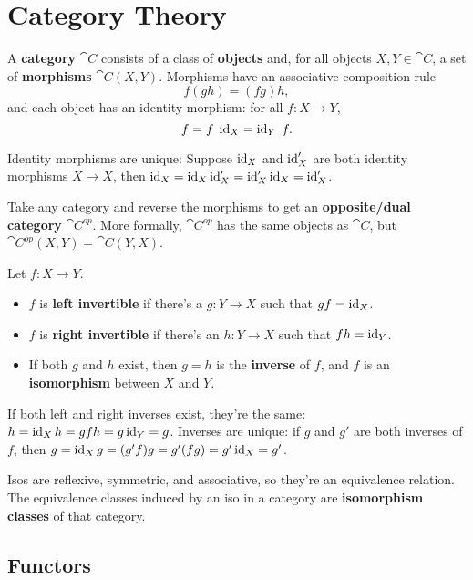 \documentclass[twoside,10pt]{report}
\begin{document}
\section{Category Theory}

\begin{defn}[]
A \textbf{category} $\cat{C}$ consists of a class of \textbf{objects} and, for all objects $X, Y \in \cat{C}$, a set of \textbf{morphisms} $\cat{C}(X,Y)$. Morphisms have an associative composition rule
\[
f(gh) = (fg)h,
\] 
and each object has an identity morphism: for all $f: X\to Y$,
\[
f = f\;\operatorname{id}_{X} = \operatorname{id}_{Y}\;f.
\] 
\end{defn}

\noindent Identity morphisms are unique: Suppose $\operatorname{id}_{X}$ and $\operatorname{id}_{X}'$ are both identity morphisms $X \to X$, then $\operatorname{id}_{X} = \operatorname{id}_{X}\operatorname{id}_{X}' = \operatorname{id}_{X}'\operatorname{id}_{X} = \operatorname{id}_{X}'$.

Take any category and reverse the morphisms to get an \textbf{opposite/dual category} $\cat{C}^{op}$. More formally, $\cat{C}^{op}$ has the same objects as $\cat{C}$, but $\cat{C}^{op}(X,Y) = \cat{C}(Y,X)$.

\begin{defn}[]
Let $f: X\to Y$.
\begin{itemize}
	\item $f$ is \textbf{left invertible} if there's a $g: Y \to X$ such that $gf = \operatorname{id}_{X}$.
	\item $f$ is \textbf{right invertible} if there's an $h: Y \to X$ such that $fh = \operatorname{id}_{Y}$.
	\item If both $g$ and $h$ exist, then $g=h$ is the \textbf{inverse} of $f$, and $f$ is an \textbf{isomorphism} between $X$ and $Y$.
\end{itemize}
\end{defn}

\noindent If both left and right inverses exist, they're the same: $h = \operatorname{id}_{X} h = gfh = g \operatorname{id}_{Y} = g$. Inverses are unique: if $g$ and $g'$ are both inverses of $f$, then $g = \operatorname{id}_{X}g = (g'f)g = g'(fg) = g' \operatorname{id}_{X} = g'$.

Isos are reflexive, symmetric, and associative, so they're an equivalence relation. The equivalence classes induced by an iso in a category are \textbf{isomorphism classes} of that category.

\subsection{Functors}
\end{document}
